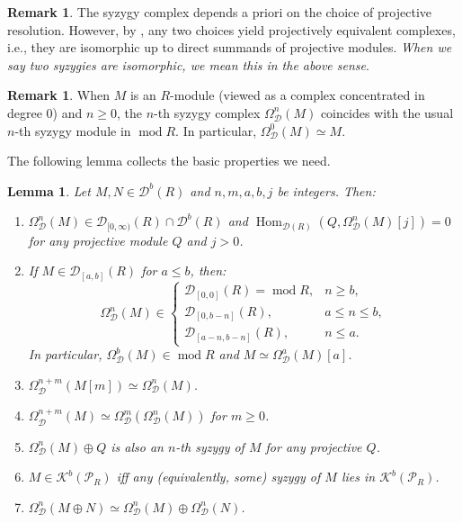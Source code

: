 \documentclass[12pt,a4paper,reqno]{amsart}
\theoremstyle{plain}
\newtheorem{lemma}[theorem]{Lemma}
\theoremstyle{definition}
\newtheorem{remark}[theorem]{Remark}
\theoremstyle{remark}
\DeclareMathOperator{\modd}{mod}
\DeclareMathOperator{\Hom}{Hom}
\newcommand{\D}{\mathcal{D}}
\newcommand{\Db}{\mathcal{D}^b}
\newcommand{\K}{\mathcal{K}}
\newcommand{\PR}{\mathcal{P}_R}
\newcommand{\syz}{\Omega_{\mathcal{D}}}
\begin{document}
\begin{remark}\label{rem:syzygy-well-defined}
The syzygy complex depends a priori on the choice of projective resolution. However, by \cite[Proposition 3.5]{Wei}, any two choices yield projectively equivalent complexes, i.e., they are isomorphic up to direct summands of projective modules. \emph{When we say two syzygies are isomorphic, we mean this in the above sense}.
\end{remark}

\begin{remark}\label{rem:classical-syzygy}
When $M$ is an $R$-module (viewed as a complex concentrated in degree $0$) and $n \ge 0$, the $n$-th syzygy complex $\syz^n(M)$ coincides with the usual $n$-th syzygy module in $\modd R$. In particular, $\syz^0(M) \simeq M$.
\end{remark}

The following lemma collects the basic properties we need.

\begin{lemma}\label{lem:syzygy-basic}
Let $M, N \in \Db(R)$ and $n, m, a, b, j$ be integers. Then:
\begin{enumerate}
\item $\syz^n(M) \in \D_{[0,\infty)}(R) \cap \Db(R)$ and $\Hom_{\D(R)}(Q, \syz^n(M)[j]) = 0$ for any projective module $Q$ and $j > 0$.

\item If $M \in \D_{[a,b]}(R)$ for $a \leq b$, then:
\[
\syz^n(M) \in 
\begin{cases}
\D_{[0,0]}(R) = \modd R, & n \geq b, \\
\D_{[0,b-n]}(R), & a \leq n \leq b, \\
\D_{[a-n,b-n]}(R), & n \leq a.
\end{cases}
\]
In particular, $\syz^b(M) \in \modd R$ and $M \simeq \syz^a(M)[a]$.

\item $\syz^{n+m}(M[m]) \simeq \syz^n(M)$.

\item $\syz^{n+m}(M) \simeq \syz^m(\syz^n(M))$ for $m \geq 0$.

\item $\syz^n(M) \oplus Q$ is also an $n$-th syzygy of $M$ for any projective $Q$.

\item $M \in \K^b(\PR)$ iff any (equivalently, some) syzygy of $M$ lies in $\K^b(\PR)$.

\item $\syz^n(M \oplus N) \simeq \syz^n(M) \oplus \syz^n(N)$.
\end{enumerate}
\end{lemma}
\end{document}
